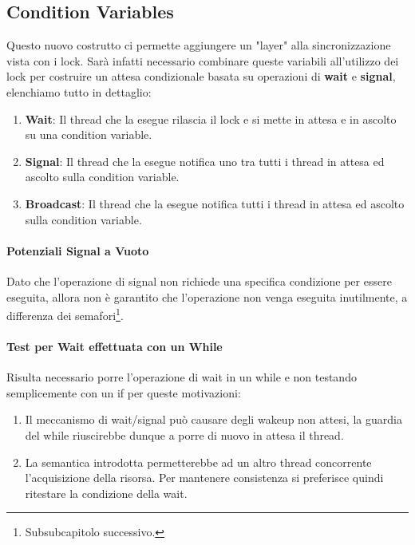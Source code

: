 \documentclass{article}
\begin{document}
\newpage

\subsection{Condition Variables}

Questo nuovo costrutto ci permette aggiungere un "layer" alla sincronizzazione vista con i lock. Sarà infatti necessario combinare queste variabili
all'utilizzo dei lock per costruire un attesa condizionale basata su operazioni di \textbf{wait} e \textbf{signal}, elenchiamo tutto in dettaglio:

\begin{enumerate}
    \item \textbf{Wait}: Il thread che la esegue rilascia il lock e si mette in attesa e in ascolto su una condition variable.
    \item \textbf{Signal}: Il thread che la esegue notifica uno tra tutti i thread in attesa ed ascolto sulla condition variable.
    \item \textbf{Broadcast}: Il thread che la esegue notifica tutti i thread in attesa ed ascolto sulla condition variable.
\end{enumerate}

\paragraph{Potenziali Signal a Vuoto} Dato che l'operazione di signal non richiede una specifica condizione per essere eseguita, allora non è garantito
che l'operazione non venga eseguita inutilmente, a differenza dei semafori\footnote{Subsubcapitolo successivo.}.

\paragraph{Test per Wait effettuata con un While} Risulta necessario porre l'operazione di wait in un while e non testando semplicemente con un if per
queste motivazioni:

\begin{enumerate}
    \item Il meccanismo di wait/signal può causare degli wakeup non attesi, la guardia del while riuscirebbe dunque a porre di nuovo in attesa il thread.
    \item La semantica introdotta permetterebbe ad un altro thread concorrente l'acquisizione della risorsa. Per mantenere consistenza si preferisce quindi
    ritestare la condizione della wait.
\end{enumerate}
\end{document}
